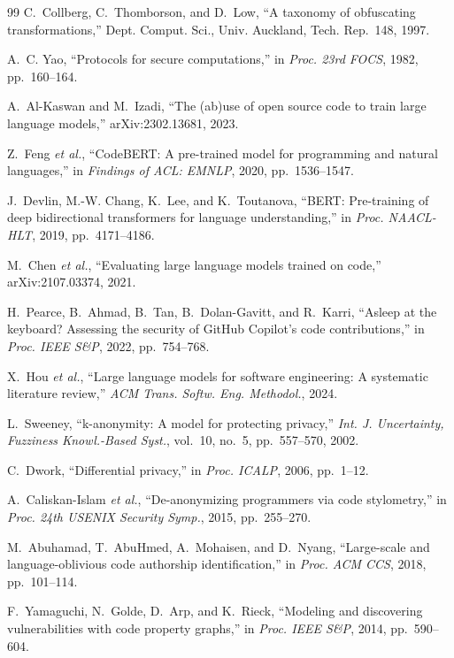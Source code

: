 \documentclass[conference]{IEEEtran}
\begin{document}
\begin{thebibliography}{99}
C.~Collberg, C.~Thomborson, and D.~Low, ``A taxonomy of obfuscating
transformations,'' Dept. Comput. Sci., Univ. Auckland, Tech. Rep.~148,
1997.

A.~C. Yao, ``Protocols for secure computations,'' in \emph{Proc. 23rd
FOCS}, 1982, pp.~160--164.

A.~Al-Kaswan and M.~Izadi, ``The (ab)use of open source code to train large
language models,'' arXiv:2302.13681, 2023.

Z.~Feng \emph{et al.}, ``CodeBERT: A pre-trained model for programming and
natural languages,'' in \emph{Findings of ACL: EMNLP}, 2020,
pp.~1536--1547.

J.~Devlin, M.-W. Chang, K.~Lee, and K.~Toutanova, ``BERT: Pre-training of
deep bidirectional transformers for language understanding,'' in \emph{Proc.
NAACL-HLT}, 2019, pp.~4171--4186.

M.~Chen \emph{et al.}, ``Evaluating large language models trained on code,''
arXiv:2107.03374, 2021.

H.~Pearce, B.~Ahmad, B.~Tan, B.~Dolan-Gavitt, and R.~Karri, ``Asleep at the
keyboard? Assessing the security of GitHub Copilot's code contributions,''
in \emph{Proc. IEEE S\&P}, 2022, pp.~754--768.

X.~Hou \emph{et al.}, ``Large language models for software engineering: A
systematic literature review,'' \emph{ACM Trans. Softw. Eng. Methodol.},
2024.

L.~Sweeney, ``k-anonymity: A model for protecting privacy,'' \emph{Int. J.
Uncertainty, Fuzziness Knowl.-Based Syst.}, vol.~10, no.~5, pp.~557--570,
2002.

C.~Dwork, ``Differential privacy,'' in \emph{Proc. ICALP}, 2006, pp.~1--12.

A.~Caliskan-Islam \emph{et al.}, ``De-anonymizing programmers via code
stylometry,'' in \emph{Proc. 24th USENIX Security Symp.}, 2015,
pp.~255--270.

M.~Abuhamad, T.~AbuHmed, A.~Mohaisen, and D.~Nyang, ``Large-scale and
language-oblivious code authorship identification,'' in \emph{Proc. ACM
CCS}, 2018, pp.~101--114.

F.~Yamaguchi, N.~Golde, D.~Arp, and K.~Rieck, ``Modeling and discovering
vulnerabilities with code property graphs,'' in \emph{Proc. IEEE S\&P},
2014, pp.~590--604.


\end{thebibliography}
\end{document}
